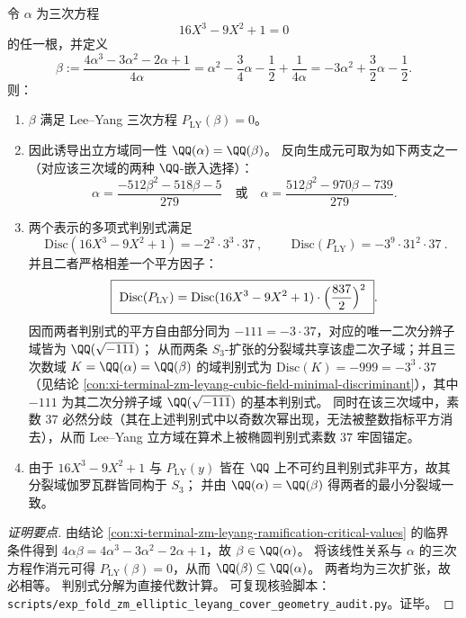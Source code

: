\begin{conclusion}\label{con:xi-terminal-zm-leyang-cubic-field-isomorphism}
令 \(\alpha\) 为三次方程
\[
16X^3-9X^2+1=0
\]
的任一根，并定义
\[
\beta:=\frac{4\alpha^3-3\alpha^2-2\alpha+1}{4\alpha}
=\alpha^{2}-\frac34\alpha-\frac12+\frac{1}{4\alpha}
=-3\alpha^2+\frac32\alpha-\frac12.
\]
则：
\begin{enumerate}
  \item \(\beta\) 满足 Lee--Yang 三次方程 \(P_{\mathrm{LY}}(\beta)=0\)。
  \item 因此诱导出立方域同一性 \(\QQ(\alpha)=\QQ(\beta)\)。
  反向生成元可取为如下两支之一（对应该三次域的两种 \(\QQ\)-嵌入选择）：
  \[
  \alpha=\frac{-512\beta^2-518\beta-5}{279}\quad\text{或}\quad \alpha=\frac{512\beta^2-970\beta-739}{279}.
  \]
  \item 两个表示的多项式判别式满足
  \[
  \boxed{\ \mathrm{Disc}(16X^3-9X^2+1)=-2^2\cdot 3^3\cdot 37\ },
  \qquad
  \boxed{\ \mathrm{Disc}(P_{\mathrm{LY}})=-3^9\cdot 31^2\cdot 37\ }.
  \]
  并且二者严格相差一个平方因子：
  \[
  \boxed{\ \mathrm{Disc}(P_{\mathrm{LY}})=\mathrm{Disc}(16X^3-9X^2+1)\cdot\Bigl(\frac{837}{2}\Bigr)^{2}\ }.
  \]
  因而两者判别式的平方自由部分同为 \(-111=-3\cdot 37\)，对应的唯一二次分辨子域皆为 \(\QQ(\sqrt{-111})\)；
  从而两条 \(S_3\)-扩张的分裂域共享该虚二次子域；并且三次数域 \(K=\QQ(\alpha)=\QQ(\beta)\) 的域判别式为 \(\mathrm{Disc}(K)=-999=-3^{3}\cdot 37\)（见结论 \ref{con:xi-terminal-zm-leyang-cubic-field-minimal-discriminant}），其中 \(-111\) 为其二次分辨子域 \(\QQ(\sqrt{-111})\) 的基本判别式。
  同时在该三次域中，素数 \(37\) 必然分歧（其在上述判别式中以奇数次幂出现，无法被整数指标平方消去），从而 Lee--Yang 立方域在算术上被椭圆判别式素数 \(37\) 牢固锚定。
  \item 由于 \(16X^3-9X^2+1\) 与 \(P_{\mathrm{LY}}(y)\) 皆在 \(\QQ\) 上不可约且判别式非平方，故其分裂域伽罗瓦群皆同构于 \(S_3\)；
  并由 \(\QQ(\alpha)=\QQ(\beta)\) 得两者的最小分裂域一致。
\end{enumerate}
\end{conclusion}
\begin{proof}[证明要点]
由结论 \ref{con:xi-terminal-zm-leyang-ramification-critical-values} 的临界条件得到
\(
4\alpha\beta=4\alpha^3-3\alpha^2-2\alpha+1
\)，故 \(\beta\in\QQ(\alpha)\)。
将该线性关系与 \(\alpha\) 的三次方程作消元可得 \(P_{\mathrm{LY}}(\beta)=0\)，从而 \(\QQ(\beta)\subseteq\QQ(\alpha)\)。
两者均为三次扩张，故必相等。
判别式分解为直接代数计算。
可复现核验脚本：\texttt{scripts/exp\_fold\_zm\_elliptic\_leyang\_cover\_geometry\_audit.py}。证毕。
\end{proof}


